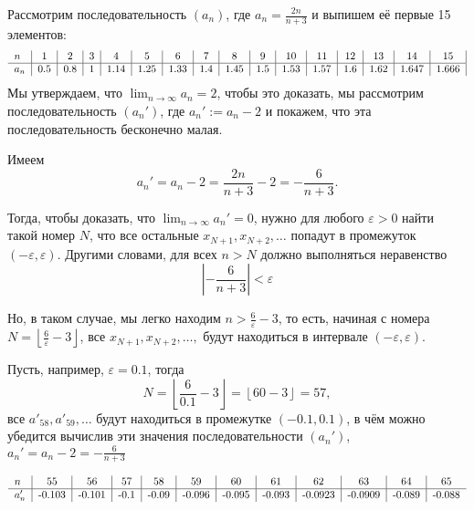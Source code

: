 \begin{example}
    Рассмотрим последовательность $(a_n)$, где $a_n = \frac{2n}{n+3}$ и выпишем её первые 15 элементов:
        \[
         \begin{tabular}{l|c|c|c|c|c|c|c|c|c|c|c|c|c|c|c|}
             $n$ & 1&2&3&4&5&6&7&8&9&10&11&12&13&14&15  \\
             \hline
             $a_n$&  0.5 & 0.8 & 1 & 1.14 & 1.25 & 1.33& 1.4 & 1.45 & 1.5 & 1.53 & 1.57 & 1.6 & 1.62 & 1.647 & 1.666 
         \end{tabular}
        \]
Мы утверждаем, что $\lim_{n\to \infty}a_n =2$, чтобы это доказать, мы рассмотрим последовательность $(a_n')$, где $a_n' := a_n  -2$ и покажем, что эта последовательность бесконечно малая.

Имеем
\[
 a_n'=a_n -2= \frac{ 2n}{n+3} -2 = - \frac{6}{n+3}.
\]

Тогда, чтобы доказать, что $\lim_{n\to \infty } a_n' = 0$, нужно для любого $\varepsilon >0$ найти такой номер $N$, что все остальные $x_{N+1}, x_{N+2}, \ldots$ попадут в промежуток $(-\varepsilon, \varepsilon)$. Другими словами, для всех $n>N$ должно выполняться неравенство
\[
  \left|-\frac{6}{n+3}\right|<\varepsilon
\]

Но, в таком случае, мы легко находим $n> \frac{6}{\varepsilon} - 3$, то есть, начиная с номера $N= \left\lfloor \frac{6}{\varepsilon} - 3 \right\rfloor$, все $x_{N+1}, x_{N+2}, \ldots,$ будут находиться в интервале $(-\varepsilon, \varepsilon).$ 

Пусть, например, $\varepsilon = 0.1$, тогда
\[
 N =\left\lfloor \frac{6}{0.1} - 3 \right\rfloor = \left\lfloor 60 - 3 \right\rfloor = 57,
\]
\ie все $a'_{58},a'_{59}, \ldots$ будут находиться в промежутке $(-0.1, 0.1)$, в чём можно убедится вычислив эти значения последовательности $(a_n')$, $a_n' = a_n - 2 = -\frac{6}{n+3}$

  \[
         \begin{tabular}{l|c|c|c|c|c|c|c|c|c|c|c}
             $n$ & 55& 56 & 57 &58 &59 & 60 &61 &62 &63 &64 &65 \\
             \hline
             $a'_n$&  -0.103 & -0.101 & -0.1 & -0.09 & -0.096 & -0.095& -0.093 & -0.0923 & -0.0909& -0.089 & -0.088 
         \end{tabular}
        \]
\end{example}

